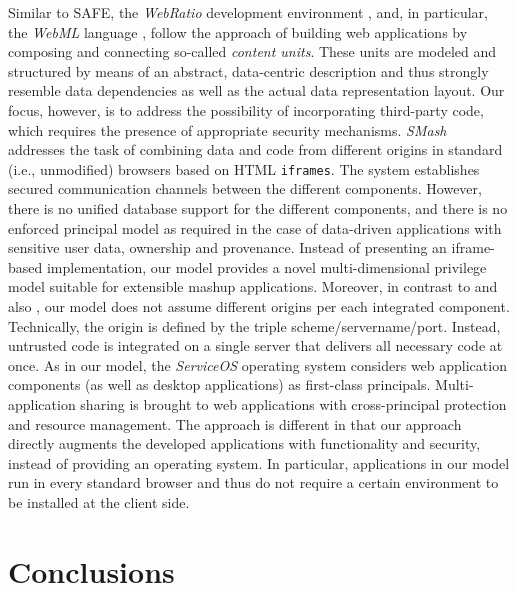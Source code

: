\documentclass{src/acm_proc_article-sp} \else
\newcommand\SAFE{SAFE\xspace}
\begin{document}
\begin{lsthere}
{Similar to \SAFE, the \textit{WebRatio} development environment
\cite{Acerbis2004:WebRatio,Brambilla2007:WebML-WebRatio}, and, in particular,
the \textit{WebML} language \cite{WebML2000a}, follow the approach of building web
applications by composing and connecting so-called \emph{content units}. These
units are modeled and structured by means of an abstract, data-centric
description and thus strongly resemble data dependencies as well as the actual
data representation layout. Our focus, however, is to address the possibility
of incorporating third-party code, which requires the presence of appropriate
security mechanisms.
\textit{SMash}~\cite{DeKeukelaere2008:SMash} addresses the task of
combining data and code from different origins in standard
(i.e., unmodified) browsers based on HTML \texttt{iframes}.
The system establishes secured communication channels
between the different components. However, there is no
unified database support for the different components, and
there is no enforced principal model as required in the case
of data-driven applications with sensitive user data,
ownership and provenance. Instead of presenting an
iframe-based implementation, our model provides a novel
multi-dimensional privilege model suitable for extensible
mashup applications.
Moreover, in contrast to \cite{DeKeukelaere2008:SMash} and
also
\cite{Magazinius2010:LatticeBasedApproach,BJM09:frames}, our
model does not assume different origins per each integrated
component. Technically, the origin is defined by the triple
scheme/servername/port. Instead, untrusted code is
integrated on a single server that delivers all necessary
code at once.
As in our model, the \textit{ServiceOS} operating system
\cite{Wang2009:Convergence} considers web application
components (as well as desktop applications) as first-class
principals. Multi-application sharing is brought to web
applications with cross-principal protection and resource
management. The approach is different in that our approach
directly augments the developed applications with
functionality and security, instead of providing an
operating system. In particular, applications in our model run in
every standard browser and thus do not require a certain
environment to be installed at the client side.












   \section{Conclusions}\label{sec:conclusions}

}
\end{lsthere}
\end{document}
